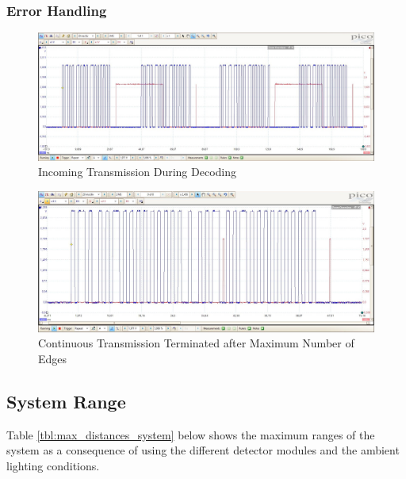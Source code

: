 \subsubsection{Error Handling}

\begin{figure}[H]
	\centering
	\includegraphics[width=.8\textwidth]{figures/results/receiver_software/transmission_too_fast_crop.JPG}
	\caption{Incoming Transmission During Decoding}
	\label{fig:transmission_too_fast}
\end{figure}

\begin{figure}[H]
	\centering
	\includegraphics[width=.8\textwidth]{figures/results/receiver_software/transmission_too_many_edges_crop.JPG}
	\caption{Continuous Transmission Terminated after Maximum Number of Edges}
	\label{fig:transmission_too_many_edges}
\end{figure}


\subsection{System Range}

Table \ref{tbl:max_distances_system} below shows the maximum ranges of the system as a consequence of using the different detector modules and the ambient lighting conditions.

